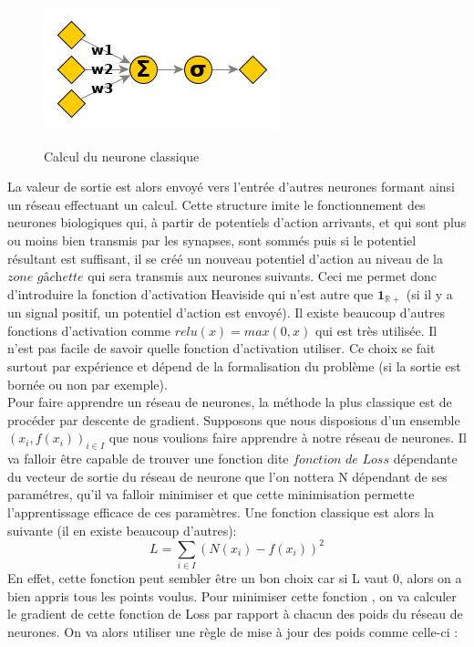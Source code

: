 \documentclass[10pt]{article}
\begin{document}
\begin{figure}[!h]
\centering
\includegraphics[scale=0.45]{ex_art_neuron.jpg}\\
\caption{Calcul du neurone classique}
\label{calcul_rna}
\end{figure}

La valeur de sortie est alors envoyé vers l'entrée d'autres neurones formant ainsi un réseau effectuant un calcul. Cette structure imite le fonctionnement des neurones biologiques qui, à partir de potentiels d'action arrivants, et qui sont plus ou moins bien transmis par les synapses, sont sommés puis si le potentiel résultant est suffisant, il se créé un nouveau potentiel d'action au niveau de la $\textit{zone gâchette}$ qui sera transmis aux neurones suivants. Ceci me permet donc d'introduire la fonction d'activation Heaviside qui n'est autre que $\mathbf{1}_\mathbb{R+}$ (si il y a un signal positif, un potentiel d'action est envoyé). Il existe beaucoup d'autres fonctions d'activation comme $relu(x) = max(0,x)$ qui est très utilisée. Il n'est pas facile de savoir quelle fonction d'activation utiliser. Ce choix se fait surtout par expérience et dépend de la formalisation du problème (si la sortie est bornée ou non par exemple).\\
Pour faire apprendre un réseau de neurones, la méthode la plus classique est de procéder par descente de gradient. Supposons que nous disposions d'un ensemble $(x_i,f(x_i))_{i\in I}$  que nous voulions faire apprendre à notre réseau de neurones. Il va falloir être capable de trouver une fonction dite $\textit{fonction de Loss}$ dépendante du vecteur de sortie du réseau de neurone que l'on nottera N dépendant de ses paramétres, qu'il va falloir minimiser et que cette minimisation permette l'apprentissage efficace de ces paramètres. Une fonction classique est alors la suivante (il en existe beaucoup d'autres):
\[L = \sum_{i\in I}(N(x_i) - f(x_i))^2\]
En effet, cette fonction peut sembler être un bon choix car si L vaut 0, alors on a bien appris tous les points voulus. Pour minimiser cette fonction , on va calculer le gradient de cette fonction de Loss par rapport à chacun des poids du réseau de neurones. On va alors utiliser une règle de mise à jour des poids comme celle-ci : 
\end{document}
